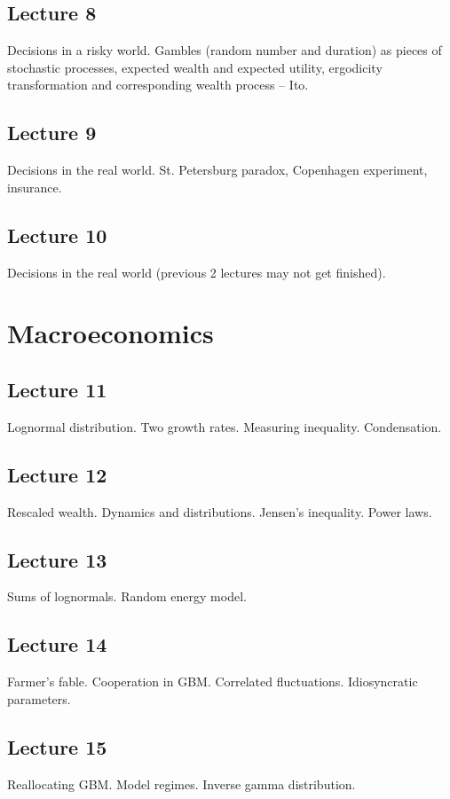 \documentclass[12pt,a4paper]{article}
\begin{document}
\subsection*{Lecture 8}
Decisions in a risky world.
Gambles (random number and duration) as pieces of stochastic processes, expected wealth and expected utility, ergodicity transformation and corresponding wealth process -- Ito.

\subsection*{Lecture 9}
Decisions in the real world.
St. Petersburg paradox, Copenhagen experiment, insurance.

\subsection*{Lecture 10}
Decisions in the real world (previous 2 lectures may not get finished).

\section*{Macroeconomics}
\subsection*{Lecture 11}
Lognormal distribution. Two growth rates. Measuring inequality. Condensation.

\subsection*{Lecture 12}
Rescaled wealth. Dynamics and distributions. Jensen's inequality. Power laws.

\subsection*{Lecture 13}
Sums of lognormals. Random energy model.

\subsection*{Lecture 14}
Farmer's fable. Cooperation in GBM. Correlated fluctuations. Idiosyncratic parameters.

\subsection*{Lecture 15}
Reallocating GBM. Model regimes. Inverse gamma distribution.
\end{document}
